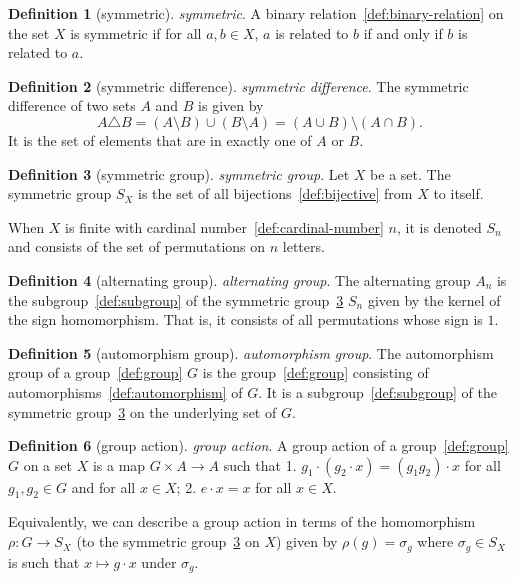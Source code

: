 \documentclass[12pt,a4paper]{article}
\theoremstyle{definition}
\newtheorem{definition}{Definition}
\begin{document}
\begin{definition}[symmetric]\label{def:symmetric}
\emph{symmetric}. A binary relation~\ref{def:binary-relation} on the set $X$ is symmetric if for all $a,b \in X$, $a$ is related to $b$ if and only if $b$ is related to $a$.
\end{definition}

\begin{definition}[symmetric difference]\label{def:symmetric-difference}
\emph{symmetric difference}. The symmetric difference of two sets $A$ and $B$ is given by $$A\triangle B = (A\setminus B)\cup(B\setminus A) = (A\cup B)\setminus (A\cap B).$$ It is the set of elements that are in exactly one of $A$ or $B$.
\end{definition}

\begin{definition}[symmetric group]\label{def:symmetric-group}
\emph{symmetric group}. Let $X$ be a set. The symmetric group $S_X$ is the set of all bijections~\ref{def:bijective} from $X$ to itself.

When $X$ is finite with cardinal number~\ref{def:cardinal-number} $n$, it is denoted $S_n$ and consists of the set of permutations on $n$ letters.
\end{definition}

\begin{definition}[alternating group]\label{def:alternating-group}
\emph{alternating group}. The alternating group $A_n$ is the subgroup~\ref{def:subgroup} of the symmetric group~\ref{def:symmetric-group} $S_n$ given by the kernel of the sign homomorphism. That is, it consists of all permutations whose sign is $1$.
\end{definition}

\begin{definition}[automorphism group]\label{def:automorphism-group}
\emph{automorphism group}. The automorphism group of a group~\ref{def:group} $G$ is the group~\ref{def:group} consisting of automorphisms~\ref{def:automorphism} of $G$. It is a subgroup~\ref{def:subgroup} of the symmetric group~\ref{def:symmetric-group} on the underlying set of $G$.
\end{definition}

\begin{definition}[group action]\label{def:group-action}
\emph{group action}. A group action of a group~\ref{def:group} $G$ on a set $X$ is a map $G\times A\to A$ such that 
1. $g_1\cdot(g_2\cdot x)= (g_1g_2)\cdot x$ for all $g_1,g_2\in G$ and for all $x\in X$;
2. $e\cdot x = x$ for all $x\in X$.

Equivalently, we can describe a group action in terms of the homomorphism $\rho:G\to S_X$ (to the symmetric group~\ref{def:symmetric-group} on $X$) given by $\rho(g) = \sigma_g$ where $\sigma_g \in S_X$ is such that $x\mapsto g\cdot x$ under $\sigma_g$.
\end{definition}
\end{document}
